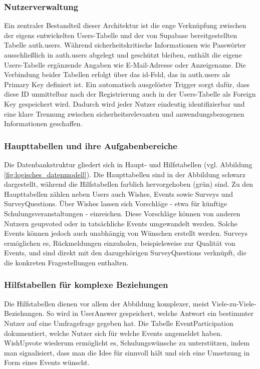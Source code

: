 \documentclass[a4paper,12pt]{article}
\begin{document}
\subsubsection{Nutzerverwaltung}
Ein zentraler Bestandteil dieser Architektur ist die enge Verknüpfung zwischen der eigens entwickelten Users-Tabelle und der von Supabase bereitgestellten Tabelle auth.users. Während sicherheitskritische Informationen wie Passwörter ausschließlich in auth.users abgelegt und geschützt bleiben, enthält die eigene Users-Tabelle ergänzende Angaben wie E-Mail-Adresse oder Anzeigename. Die Verbindung beider Tabellen erfolgt über das id-Feld, das in auth.users als Primary Key definiert ist. Ein automatisch ausgelöster Trigger sorgt dafür, dass diese ID unmittelbar nach der Registrierung auch in der Users-Tabelle als Foreign Key gespeichert wird. Dadurch wird jeder Nutzer eindeutig identifizierbar und eine klare Trennung zwischen sicherheitsrelevanten und anwendungsbezogenen Informationen geschaffen.


\subsubsection{Haupttabellen und ihre Aufgabenbereiche}
Die Datenbankstruktur gliedert sich in Haupt- und Hilfstabellen (vgl. Abbildung \ref{fig:logisches_datenmodell}). Die Haupttabellen sind in der Abbildung schwarz dargestellt, während die Hilfstabellen farblich hervorgehoben (grün) sind. Zu den Haupttabellen zählen neben Users auch Wishes, Events sowie Surveys und SurveyQuestions. Über Wishes lassen sich Vorschläge - etwa für künftige Schulungsveranstaltungen - einreichen. Diese Vorschläge können von anderen Nutzern geupvoted oder in tatsächliche Events umgewandelt werden. Solche Events können jedoch auch unabhängig von Wünschen erstellt werden. Surveys ermöglichen es, Rückmeldungen einzuholen, beispielsweise zur Qualität von Events, und sind direkt mit den dazugehörigen SurveyQuestions verknüpft, die die konkreten Fragestellungen enthalten.


\subsubsection{Hilfstabellen für komplexe Beziehungen}
Die Hilfstabellen dienen vor allem der Abbildung komplexer, meist Viele-zu-Viele-Beziehungen. So wird in UserAnswer gespeichert, welche Antwort ein bestimmter Nutzer auf eine Umfragefrage gegeben hat. Die Tabelle EventParticipation dokumentiert, welche Nutzer sich für welche Events angemeldet haben. WishUpvote wiederum ermöglicht es, Schulungswünsche zu unterstützen, indem man signalisiert, dass man die Idee für sinnvoll hält und sich eine Umsetzung in Form eines Events wünscht.
\end{document}
